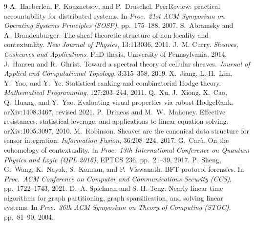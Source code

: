 \documentclass[11pt,a4paper]{article}
\begin{document}
\begin{thebibliography}{9}
 A.~Haeberlen, P.~Kouznetsov, and P.~Druschel. PeerReview: practical accountability for distributed
systems. In \emph{Proc.\ 21st ACM Symposium on Operating Systems Principles (SOSP)}, pp.~175--188, 2007.
 S.~Abramsky and A.~Brandenburger. The sheaf-theoretic structure of non-locality and
contextuality. \emph{New Journal of Physics}, 13:113036, 2011.
 J.~M. Curry. \emph{Sheaves, Cosheaves and Applications}. PhD thesis, University of Pennsylvania, 2014.
 J.~Hansen and R.~Ghrist. Toward a spectral theory of cellular sheaves. \emph{Journal of Applied
and Computational Topology}, 3:315--358, 2019.
 X.~Jiang, L.-H.~Lim, Y.~Yao, and Y.~Ye. Statistical ranking and combinatorial Hodge theory.
\emph{Mathematical Programming}, 127:203--244, 2011.
 Q.~Xu, J.~Xiong, X.~Cao, Q.~Huang, and Y.~Yao. Evaluating visual properties via robust
HodgeRank. arXiv:1408.3467, revised 2021.
 P.~Drineas and M.~W.~Mahoney. Effective resistances, statistical leverage, and applications
to linear equation solving. arXiv:1005.3097, 2010.
 M.~Robinson. Sheaves are the canonical data structure for sensor integration. \emph{Information
Fusion}, 36:208--224, 2017.
 G.~Car\`u. On the cohomology of contextuality. In \emph{Proc.\ 13th International Conference on Quantum
Physics and Logic (QPL 2016)}, EPTCS 236, pp.~21--39, 2017.
 P.~Sheng, G.~Wang, K.~Nayak, S.~Kannan, and P.~Viswanath. BFT protocol forensics. In \emph{Proc.\ ACM
Conference on Computer and Communications Security (CCS)}, pp.~1722--1743, 2021.
 D.~A. Spielman and S.-H. Teng. Nearly-linear time algorithms for graph partitioning, graph
sparsification, and solving linear systems. In \emph{Proc.\ 36th ACM Symposium on Theory of Computing (STOC)},
pp.~81--90, 2004.
\end{thebibliography}
\end{document}
